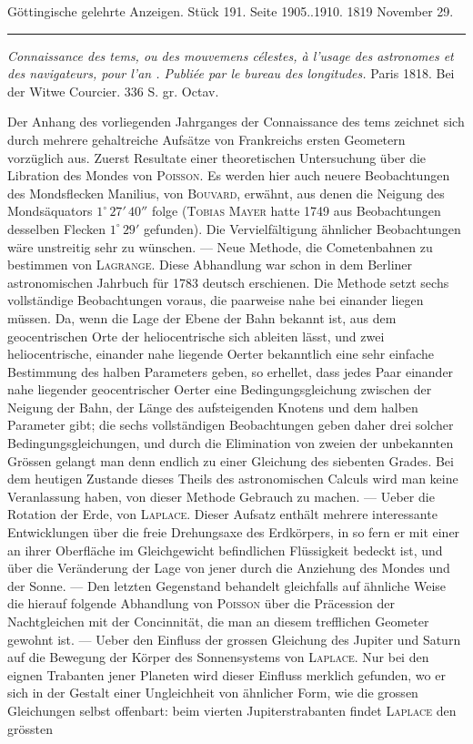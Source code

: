 \clearpage
{}
\begin{center}\small Göttingische gelehrte Anzeigen. Stück 191. Seite 1905..1910. 1819 November 29.\\[3pt]\rule{.72\linewidth}{.3pt}\end{center}

\noindent\emph{Connaissance des tems, ou des mouvemens célestes, à l'usage des astronomes et des navigateurs, pour l'an {}. Publiée par le bureau des longitudes.} Paris 1818. Bei der Witwe Courcier. 336 S. gr. Octav.

Der Anhang des vorliegenden Jahrganges der Connaissance des tems zeichnet sich durch mehrere gehaltreiche Aufsätze von Frankreichs ersten Geometern vorzüglich aus. Zuerst Resultate einer theoretischen Untersuchung über die Libration des Mondes von \textsc{Poisson}. Es werden hier auch neuere Beobachtungen des Mondsflecken Manilius, von \textsc{Bouvard}, erwähnt, aus denen die Neigung des Mondsäquators $1^\circ\,27'\,40''$ folge (\textsc{Tobias Mayer} hatte 1749 aus Beobachtungen desselben Flecken $1^\circ\,29'$ gefunden). Die Vervielfältigung ähnlicher Beobachtungen wäre unstreitig sehr zu wünschen. --- Neue Methode, die Cometenbahnen zu bestimmen von \textsc{Lagrange}. Diese Abhandlung war schon in dem Berliner astronomischen Jahrbuch für 1783 deutsch erschienen. Die Methode setzt sechs vollständige Beobachtungen voraus, die paarweise nahe bei einander liegen müssen. Da, wenn die Lage der Ebene der Bahn bekannt ist, aus dem geocentrischen Orte der heliocentrische sich ableiten lässt, und zwei heliocentrische, einander nahe liegende Oerter bekanntlich eine sehr einfache Bestimmung des halben Parameters geben, so erhellet, dass jedes Paar einander nahe liegender geocentrischer Oerter eine Bedingungsgleichung zwischen der Neigung der Bahn, der Länge des aufsteigenden Knotens und dem halben Parameter gibt; die sechs vollständigen Beobachtungen geben daher drei solcher Bedingungsgleichungen, und durch die Elimination von zweien der unbekannten Grössen gelangt man denn endlich zu einer Gleichung des siebenten Grades. Bei dem heutigen Zustande dieses Theils des astronomischen Calculs wird man keine Veranlassung haben, von dieser Methode Gebrauch zu machen. --- Ueber die Rotation der Erde, von \textsc{Laplace}. Dieser Aufsatz enthält mehrere interessante Entwicklungen über die freie Drehungsaxe des Erdkörpers, in so fern er mit einer an ihrer Oberfläche im Gleichgewicht befindlichen Flüssigkeit bedeckt ist, und über die Veränderung der Lage von jener durch die Anziehung des Mondes und der Sonne. --- Den letzten Gegenstand behandelt gleichfalls auf ähnliche Weise die hierauf folgende Abhandlung von \textsc{Poisson} über die Präcession der Nachtgleichen mit der Concinnität, die man an diesem trefflichen Geometer gewohnt ist. --- Ueber den Einfluss der grossen Gleichung des Jupiter und Saturn auf die Bewegung der Körper des Sonnensystems von \textsc{Laplace}. Nur bei den eignen Trabanten jener Planeten wird dieser Einfluss merklich gefunden, wo er sich in der Gestalt einer Ungleichheit von ähnlicher Form, wie die grossen Gleichungen selbst offenbart: beim vierten Jupiterstrabanten findet \textsc{Laplace} den grössten 